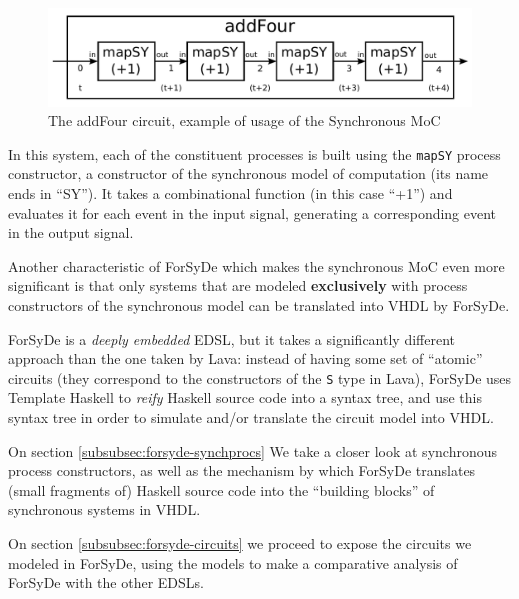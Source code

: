             \begin{figure}[h!]
                \includegraphics[width=1.0\textwidth]{imgs/forsyde-addFour.pdf}
                \caption{The addFour circuit, example of usage of the Synchronous MoC
                    \label{lst:forsyde-addFour}}
            \end{figure}

            In this system, each of the constituent processes is built using the \texttt{mapSY}
            process constructor, a constructor of the synchronous model of computation (its name
            ends in ``SY''). It takes a combinational function (in this case ``+1'') and evaluates
            it for each event in the input signal, generating a corresponding event in the output
            signal.

            Another characteristic of ForSyDe which makes the synchronous MoC even more significant
            is that only systems that are modeled \textbf{exclusively} with process constructors of
            the synchronous model can be translated into VHDL by ForSyDe.

            ForSyDe is a \emph{deeply embedded} EDSL, but it takes a significantly different
            approach than the one taken by Lava: instead of having some set of ``atomic'' circuits
            (they correspond to the constructors of the \texttt{S} type in Lava), ForSyDe uses
            Template Haskell to \emph{reify} Haskell source code into a syntax tree, and use this
            syntax tree in order to simulate and/or translate the circuit model into VHDL.

            On section \ref{subsubsec:forsyde-synchprocs} We take a closer look at synchronous
            process constructors, as well as the mechanism by which ForSyDe translates (small
            fragments of) Haskell source code into the ``building blocks'' of synchronous systems in
            VHDL.

            On section \ref{subsubsec:forsyde-circuits} we proceed to expose the circuits we modeled
            in ForSyDe, using the models to make a comparative analysis of ForSyDe with the other
            EDSLs.

